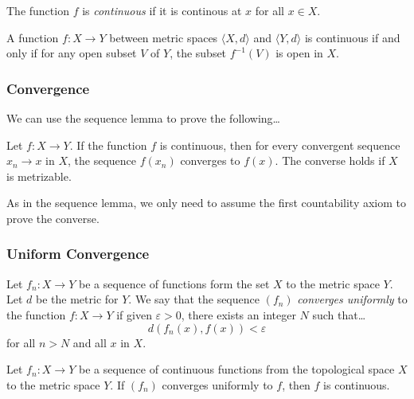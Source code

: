\noindent The function $f$ is \emph{continuous} if it is continous at $x$ for all $x \in X$.

\begin{theorem}
A function $f:X \rightarrow Y$ between metric spaces $\langle X,d \rangle$ and $\langle Y,d \rangle$ is continuous if and only if for any open subset $V$ of $Y$, the subset $f^{-1}(V)$ is open in $X$.
\end{theorem}

\subsubsection{Convergence}\label{metricconvergence}
\noindent We can use the sequence lemma to prove the following\dots
\begin{theorem}
Let $f : X \rightarrow Y$. If the function $f$ is continuous, then for every convergent sequence $x_n \rightarrow x$ in $X$, the sequence
$f(x_n)$ converges to $f(x)$. The converse holds if $X$ is metrizable.
\end{theorem}
\noindent As in the sequence lemma, we only need to assume the first countability axiom to prove the converse.

\subsubsection{Uniform Convergence}\label{uniformconvergence}
Let $f_n : X \rightarrow Y$ be a sequence of functions form the set $X$ to the metric space $Y$. Let
$d$ be the metric for $Y$. We say that the sequence $(f_n)$ \emph{converges uniformly} to the function $f: X \rightarrow Y$
if given $\varepsilon > 0$, there exists an integer $N$ such that\dots
$$d(f_n(x), f(x)) < \varepsilon$$
for all $n > N$ and all $x$ in $X$.

\begin{theorem}
Let $f_n : X \rightarrow Y$ be a sequence of continuous functions from the topological space $X$ to the metric space $Y$.
If $(f_n)$ converges uniformly to $f$, then $f$ is continuous.
\end{theorem}

